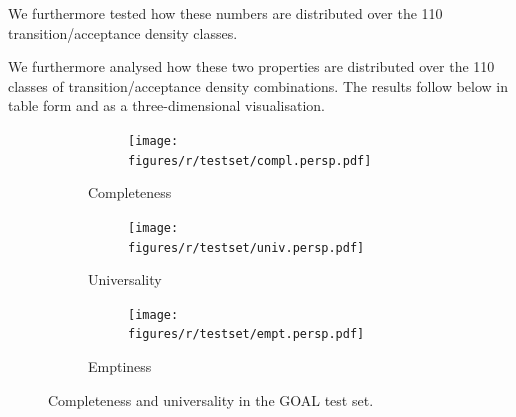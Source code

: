 We furthermore tested how these numbers are distributed over the 110 transition/acceptance density classes.

We furthermore analysed how these two properties are distributed over the 110 classes of transition/acceptance density combinations. The results follow below in table form and as a three-dimensional visualisation.


\renewcommand{\tabcolsep}{0.05cm}
\renewcommand{\arraystretch}{1.05}

\begin{figure}[htb]
  \centering
  \begin{subfigure}{\textwidth}
    \begin{subtable}{0.47\textwidth}
    
    \end{subtable}
    \hfill
    \begin{subfigure}{0.52\textwidth}
    \texttt{[image: figures/r/testset/compl.persp.pdf]}
    \end{subfigure}
  \caption{Completeness}
  \end{subfigure}

 \begin{subfigure}{\textwidth}
    \begin{subtable}{0.47\textwidth}
    
    \end{subtable}
    \hfill
    \begin{subfigure}{0.52\textwidth}
    \texttt{[image: figures/r/testset/univ.persp.pdf]}
    \end{subfigure}
  \caption{Universality}
  \end{subfigure}

  \begin{subfigure}{\textwidth}
    \begin{subtable}{0.47\textwidth}
    
    \end{subtable}
    \hfill
    \begin{subfigure}{0.52\textwidth}
    \texttt{[image: figures/r/testset/empt.persp.pdf]}
    \end{subfigure}
  \caption{Emptiness}
  \end{subfigure}
\caption{Completeness and universality in the GOAL test set.}
\label{4_compl_univ}
\end{figure}

\tablestyle  %

